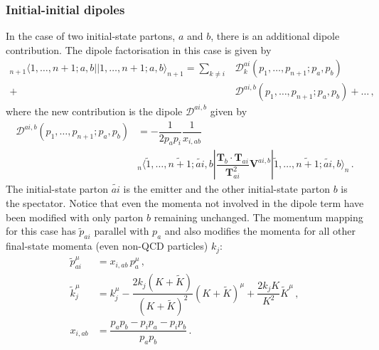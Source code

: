 \documentclass[main.tex]{subfiles}
\begin{document}
        \subsubsection{Initial-initial dipoles}
        In the case of two initial-state partons, $a$ and $b$, there
        is an additional dipole contribution. The dipole factorisation
        in this case is  given by
        \begin{equation}\label{eqn:II_factorisation}
            \begin{split}
                {}_{n+1} \langle 1, \ldots, n+1; a,b| | 1, \ldots, n+1;a,b \rangle_{n+1} = \sum_{k \neq i} &\mathcal{D}_{k}^{ai}(p_{1}, \ldots, p_{n+1};p_{a},p_{b}) \\
                + &\mathcal{D}^{ai,b}(p_{1}, \ldots, p_{n+1};p_{a},p_{b}) + \ldots \, ,
            \end{split}
        \end{equation}
        where the new contribution is the dipole $\mathcal{D}^{ai,b}$ given by
        \begin{equation}\label{eqn:D_aib}
            \begin{split}
                \mathcal{D}^{ai,b}(p_{1},\ldots,p_{n+1};p_{a},p_{b}) &= -\dfrac{1}{2p_{a}p_{i}} \dfrac{1}{x_{i,ab}} \\
                &{}_{n}\langle \tilde{1}, \ldots, \widetilde{n+1}; \widetilde{ai}, b | \dfrac{\boldsymbol{T}_{b}\cdot\boldsymbol{T}_{ai}}{\boldsymbol{T}^{2}_{ai}}\boldsymbol{V}^{ai,b} | \tilde{1}, \ldots, \widetilde{n+1}; \widetilde{ai}, b \rangle_{n} \, .
            \end{split}
        \end{equation}
        The initial-state parton $\widetilde{ai}$ is the emitter and the
        other initial-state parton $b$ is the spectator. Notice that even the
        momenta not involved in the dipole term have been modified with only
        parton $b$ remaining unchanged. The momentum mapping for this case
        has $\tilde{p}_{ai}$ parallel with $p_{a}$ and also
        modifies the momenta for all other final-state momenta (even non-QCD particles) $k_{j}$:
        \begin{align}\label{eqn:II_mapping}
            \tilde{p}_{ai}^{\mu} &= x_{i,ab} \, p_{a}^{\mu} \, , \nonumber \\
            \tilde{k}_{j}^{\mu} &= k_{j}^{\mu} - \dfrac{2k_{j}(K+\widetilde{K})}{(K+\widetilde{K})^{2}}(K+\widetilde{K})^{\mu} + \dfrac{2k_{j}K}{K^{2}}\widetilde{K}^{\mu} \, , \\
            x_{i,ab} &= \dfrac{p_{a}p_{b} - p_{i}p_{a}-p_{i}p_{b}}{p_{a}p_{b}} \, . \nonumber
        \end{align}
\end{document}
